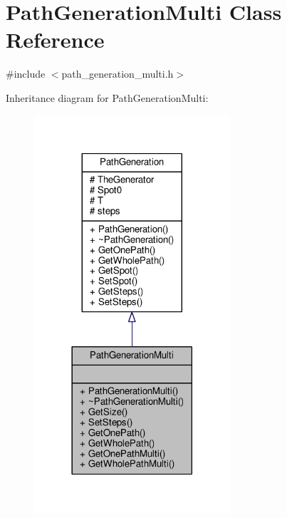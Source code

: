 \hypertarget{classPathGenerationMulti}{}\section{Path\+Generation\+Multi Class Reference}
\label{classPathGenerationMulti}


{\ttfamily \#include $<$path\+\_\+generation\+\_\+multi.\+h$>$}



Inheritance diagram for Path\+Generation\+Multi\+:
\nopagebreak
\begin{figure}[H]
\begin{center}
\leavevmode
\includegraphics[width=206pt]{classPathGenerationMulti__inherit__graph}
\end{center}
\end{figure}


